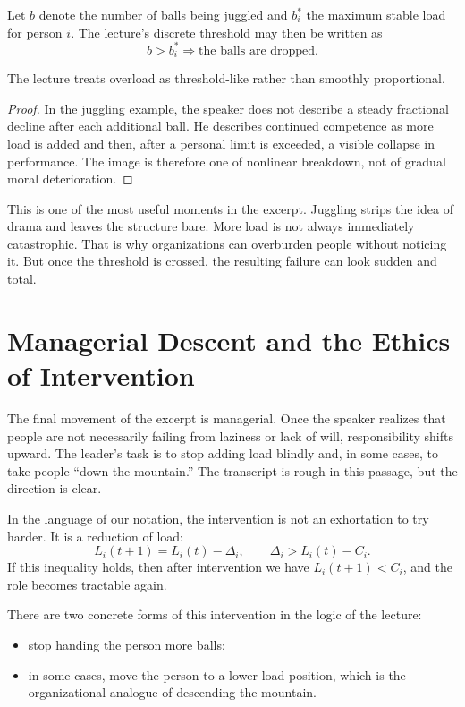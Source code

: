 Let \(b\) denote the number of balls being juggled and \(b_i^\ast\) the maximum stable load for person \(i\). The lecture's discrete threshold may then be written as
\begin{equation}
b > b_i^\ast \Longrightarrow \text{the balls are dropped.}
\end{equation}

\begin{proposition}
The lecture treats overload as threshold-like rather than smoothly proportional.
\end{proposition}

\begin{proof}
In the juggling example, the speaker does not describe a steady fractional decline after each additional ball. He describes continued competence as more load is added and then, after a personal limit is exceeded, a visible collapse in performance. The image is therefore one of nonlinear breakdown, not of gradual moral deterioration.
\end{proof}

This is one of the most useful moments in the excerpt. Juggling strips the idea of drama and leaves the structure bare. More load is not always immediately catastrophic. That is why organizations can overburden people without noticing it. But once the threshold is crossed, the resulting failure can look sudden and total.

\section{Managerial Descent and the Ethics of Intervention}

The final movement of the excerpt is managerial. Once the speaker realizes that people are not necessarily failing from laziness or lack of will, responsibility shifts upward. The leader's task is to stop adding load blindly and, in some cases, to take people ``down the mountain.'' The transcript is rough in this passage, but the direction is clear.

In the language of our notation, the intervention is not an exhortation to try harder. It is a reduction of load:
\begin{equation}
L_i(t+1) = L_i(t) - \Delta_i,
\qquad
\Delta_i > L_i(t)-C_i.
\end{equation}
If this inequality holds, then after intervention we have \(L_i(t+1) < C_i\), and the role becomes tractable again.

There are two concrete forms of this intervention in the logic of the lecture:
\begin{itemize}
\item stop handing the person more balls;
\item in some cases, move the person to a lower-load position, which is the organizational analogue of descending the mountain.
\end{itemize}

